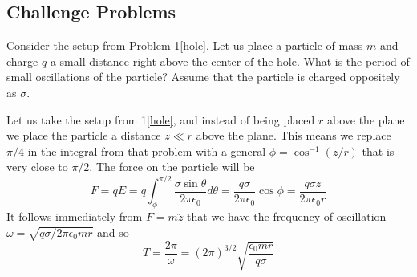 \documentclass[11pt]{scrartcl}
\begin{document}
\subsection{Challenge Problems}
\begin{prob}
    Consider the setup from Problem 1\ref{hole}. Let us place a particle of mass $m$ and charge $q$ a small distance right above the center of the hole. What is the period of small oscillations of the particle? Assume that the particle is charged oppositely as $\sigma$.
\end{prob}
\begin{sol}
    Let us take the setup from 1\ref{hole}, and instead of being placed $r$ above the plane we place the particle a distance $z\ll r$ above the plane. This means we replace $\pi/4$ in the integral from that problem with a general $\phi=\cos^{-1}(z/r)$ that is very close to $\pi/2$. The force on the particle will be $$F=qE=q\int_\phi^{\pi/2}\frac{\sigma\sin\theta}{2\pi\epsilon_0}d\theta=\frac{q\sigma}{2\pi\epsilon_0}\cos\phi = \frac{q\sigma z}{2\pi\epsilon_0r}$$It follows immediately from $F=m\ddot z$ that we have the frequency of oscillation $\omega = \sqrt{q\sigma / 2\pi\epsilon_0 mr}$ and so $$T=\frac{2\pi}{\omega}=(2\pi)^{3/2}\sqrt{\frac{\epsilon_0mr}{q\sigma}}$$
\end{sol}
\end{document}
